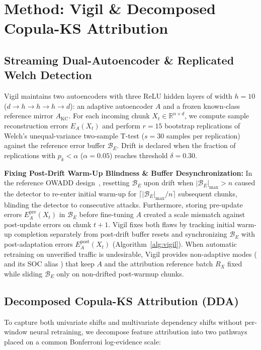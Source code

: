 \documentclass[10pt,conference]{IEEEtran}
\begin{document}
\section{Method: Vigil \& Decomposed Copula-KS Attribution}
\label{sec:method}

\subsection{Streaming Dual-Autoencoder \& Replicated Welch Detection}
Vigil maintains two autoencoders with three ReLU hidden layers of width $h = 10$
($d \to h \to h \to h \to d$): an adaptive autoencoder $A$ and a frozen
known-class reference mirror $A_{\mathrm{KC}}$.
For each incoming chunk $X_t \in \mathbb{R}^{n \times d}$, we compute sample
reconstruction errors $E_A(X_t)$ and perform $r = 15$ bootstrap replications
of Welch's unequal-variance two-sample T-test ($s = 30$ samples per replication)
against the reference error buffer $\mathcal{B}_E$. Drift is declared when the
fraction of replications with $p_k < \alpha$ ($\alpha = 0.05$) reaches
threshold $\delta = 0.30$.

\textbf{Fixing Post-Drift Warm-Up Blindness \& Buffer Desynchronization:}
In the reference OWADD design~\cite{komorniczak2026owadd}, resetting
$\mathcal{B}_E$ upon drift when $|\mathcal{B}_E|_{\max} > n$ caused the detector
to re-enter initial warm-up for $\lceil |\mathcal{B}_E|_{\max} / n \rceil$
subsequent chunks, blinding the detector to consecutive attacks. Furthermore,
storing pre-update errors $E_A^{\mathrm{pre}}(X_t)$ in $\mathcal{B}_E$ before
fine-tuning $A$ created a scale mismatch against post-update errors on chunk
$t+1$. Vigil fixes both flaws by tracking initial warm-up completion separately
from post-drift buffer resets and synchronizing $\mathcal{B}_E$ with
post-adaptation errors $E_A^{\mathrm{post}}(X_t)$ (Algorithm~\ref{alg:vigil}).
When automatic retraining on unverified traffic is undesirable, Vigil provides
non-adaptive modes ( and its SOC alias
) that keep $A$ and the attribution reference batch
$R_X$ fixed while sliding $\mathcal{B}_E$ only on non-drifted post-warmup chunks.

\subsection{Decomposed Copula-KS Attribution (DDA)}
To capture both univariate shifts and multivariate dependency shifts without
per-window neural retraining, we decompose feature attribution into two
pathways placed on a common Bonferroni log-evidence scale:
\end{document}
